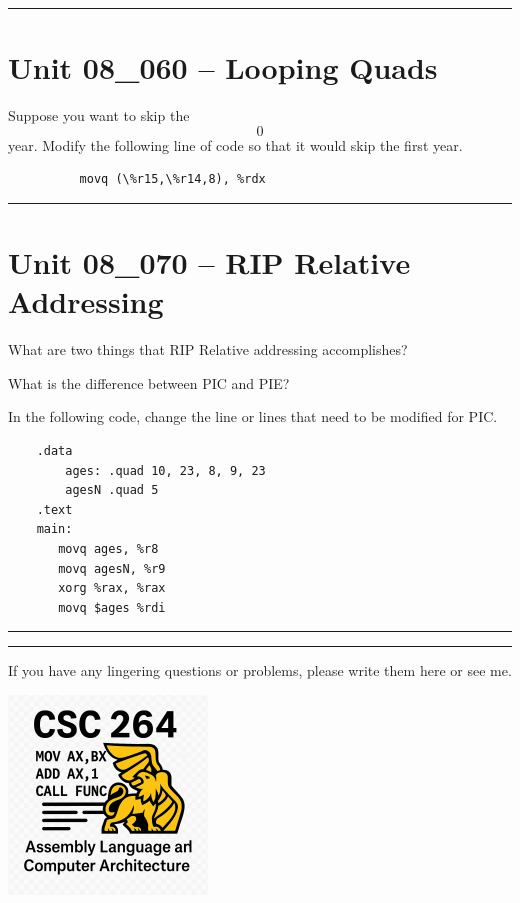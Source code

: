 \documentclass[letterpaper,12pt]{exam}
\newcommand{\unit}{Unit 08}
\begin{document}
\begin{questions}
\rule{0.5\textwidth}{.4pt} %
\section*{\unit\_060 -- Looping Quads }
\begin{samepage}
    \question Suppose you want to skip the \[0\] year. Modify the following line of code so that it would skip the first year.
    \begin{verbatim}
          movq (\%r15,\%r14,8), %rdx
    \end{verbatim}
    \vspace{5mm}
\end{samepage}
\par
\rule{0.5\textwidth}{.4pt} %

\section*{\unit\_070 -- RIP Relative Addressing}
\begin{samepage}
    \question What are two things that RIP Relative addressing accomplishes?
    \vspace{5mm}
\end{samepage}
\par

\begin{samepage}
    \question What is the difference between PIC and PIE?
    \vspace{5mm}
\end{samepage}
\par
\begin{samepage}
    \question In the following code, change the line or lines that need to be modified for PIC.  
    \begin{verbatim}
    .data
        ages: .quad 10, 23, 8, 9, 23
        agesN .quad 5
    .text
    main:
       movq ages, %r8
       movq agesN, %r9
       xorg %rax, %rax
       movq $ages %rdi     
    \end{verbatim}
\end{samepage}
\par
 
\rule{0.5\textwidth}{.4pt} %




\end{questions} 
\begin{center}
    \rule{0.667\textwidth}{.8pt} %
\end{center}


If you have any lingering questions or problems, please write them here or see me.
\vfill
\begin{center}
\includegraphics{../csc264Logo}
\end{center}
\end{document}
